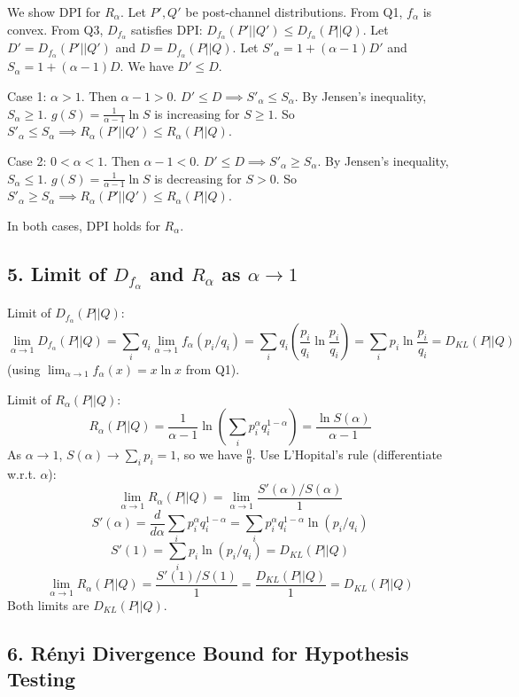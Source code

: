 \documentclass{article}
\begin{document}
We show DPI for $R_\alpha$. Let $P', Q'$ be post-channel distributions. From Q1, $f_\alpha$ is convex. From Q3, $D_{f_\alpha}$ satisfies DPI: $D_{f_\alpha}(P'||Q') \le D_{f_\alpha}(P||Q)$.
Let $D' = D_{f_\alpha}(P'||Q')$ and $D = D_{f_\alpha}(P||Q)$. Let $S'_\alpha = 1 + (\alpha-1)D'$ and $S_\alpha = 1 + (\alpha-1)D$. We have $D' \le D$.

Case 1: $\alpha > 1$. Then $\alpha - 1 > 0$. $D' \le D \implies S'_\alpha \le S_\alpha$. By Jensen's inequality, $S_\alpha \ge 1$. $g(S) = \frac{1}{\alpha-1} \ln S$ is increasing for $S \ge 1$. So $S'_\alpha \le S_\alpha \implies R_\alpha(P'||Q') \le R_\alpha(P||Q)$.

Case 2: $0 < \alpha < 1$. Then $\alpha - 1 < 0$. $D' \le D \implies S'_\alpha \ge S_\alpha$. By Jensen's inequality, $S_\alpha \le 1$. $g(S) = \frac{1}{\alpha-1} \ln S$ is decreasing for $S > 0$. So $S'_\alpha \ge S_\alpha \implies R_\alpha(P'||Q') \le R_\alpha(P||Q)$.

In both cases, DPI holds for $R_\alpha$.

\subsection*{5. Limit of $D_{f_\alpha}$ and $R_\alpha$ as $\alpha \to 1$}

Limit of $D_{f_\alpha}(P||Q)$:
\[ \lim_{\alpha \to 1} D_{f_\alpha}(P||Q) = \sum_i q_i \lim_{\alpha \to 1} f_\alpha(p_i/q_i) = \sum_i q_i \left( \frac{p_i}{q_i} \ln \frac{p_i}{q_i} \right) = \sum_i p_i \ln \frac{p_i}{q_i} = D_{KL}(P||Q) \]
(using $\lim_{\alpha\to 1} f_\alpha(x) = x \ln x$ from Q1).

Limit of $R_\alpha(P||Q)$:
\[ R_\alpha(P||Q) = \frac{1}{\alpha-1} \ln \left( \sum_i p_i^\alpha q_i^{1-\alpha} \right) = \frac{\ln S(\alpha)}{\alpha-1} \]
As $\alpha \to 1$, $S(\alpha) \to \sum_i p_i = 1$, so we have $\frac{0}{0}$. Use L'Hopital's rule (differentiate w.r.t. $\alpha$):
\[ \lim_{\alpha \to 1} R_\alpha(P||Q) = \lim_{\alpha \to 1} \frac{S'(\alpha) / S(\alpha)}{1} \]
\[ S'(\alpha) = \frac{d}{d\alpha} \sum_i p_i^\alpha q_i^{1-\alpha} = \sum_i p_i^\alpha q_i^{1-\alpha} \ln(p_i/q_i) \]
\[ S'(1) = \sum_i p_i \ln(p_i/q_i) = D_{KL}(P||Q) \]
\[ \lim_{\alpha \to 1} R_\alpha(P||Q) = \frac{S'(1) / S(1)}{1} = \frac{D_{KL}(P||Q)}{1} = D_{KL}(P||Q) \]
Both limits are $D_{KL}(P||Q)$.

\subsection*{6. Rényi Divergence Bound for Hypothesis Testing}
\end{document}
